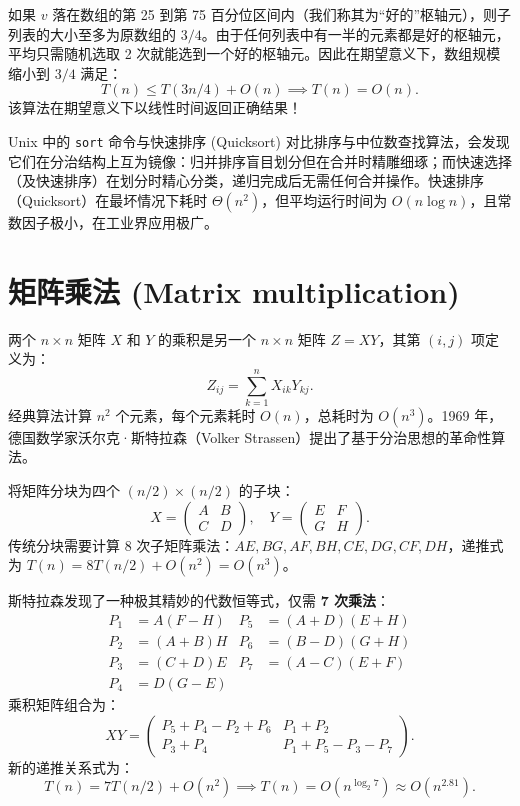 如果 $v$ 落在数组的第 25 到第 75 百分位区间内（我们称其为“好的”枢轴元），则子列表的大小至多为原数组的 $3/4$。由于任何列表中有一半的元素都是好的枢轴元，平均只需随机选取 2 次就能选到一个好的枢轴元。因此在期望意义下，数组规模缩小到 $3/4$ 满足：
\[
T(n) \le T(3n/4) + O(n) \implies T(n) = O(n).
\]
该算法在期望意义下以线性时间返回正确结果！

\begin{sidebarbox}{Unix 中的 \texttt{sort} 命令与快速排序 (Quicksort)}
对比排序与中位数查找算法，会发现它们在分治结构上互为镜像：归并排序盲目划分但在合并时精雕细琢；而快速选择（及快速排序）在划分时精心分类，递归完成后无需任何合并操作。快速排序（Quicksort）在最坏情况下耗时 $\Theta(n^2)$，但平均运行时间为 $O(n \log n)$，且常数因子极小，在工业界应用极广。
\end{sidebarbox}

\section{矩阵乘法 (Matrix multiplication)}

两个 $n \times n$ 矩阵 $X$ 和 $Y$ 的乘积是另一个 $n \times n$ 矩阵 $Z = XY$，其第 $(i, j)$ 项定义为：
\[
Z_{ij} = \sum_{k=1}^n X_{ik} Y_{kj}.
\]
经典算法计算 $n^2$ 个元素，每个元素耗时 $O(n)$，总耗时为 $O(n^3)$。1969 年，德国数学家沃尔克·斯特拉森（Volker Strassen）提出了基于分治思想的革命性算法。

将矩阵分块为四个 $(n/2) \times (n/2)$ 的子块：
\[
X = \begin{pmatrix} A & B \\ C & D \end{pmatrix}, \quad Y = \begin{pmatrix} E & F \\ G & H \end{pmatrix}.
\]
传统分块需要计算 8 次子矩阵乘法：$AE, BG, AF, BH, CE, DG, CF, DH$，递推式为 $T(n) = 8T(n/2) + O(n^2) = O(n^3)$。

斯特拉森发现了一种极其精妙的代数恒等式，仅需 \textbf{7 次乘法}：
\begin{align*}
P_1 &= A(F - H) & P_5 &= (A + D)(E + H) \\
P_2 &= (A + B)H & P_6 &= (B - D)(G + H) \\
P_3 &= (C + D)E & P_7 &= (A - C)(E + F) \\
P_4 &= D(G - E) & &
\end{align*}
乘积矩阵组合为：
\[
XY = \begin{pmatrix} P_5 + P_4 - P_2 + P_6 & P_1 + P_2 \\ P_3 + P_4 & P_1 + P_5 - P_3 - P_7 \end{pmatrix}.
\]
新的递推关系式为：
\[
T(n) = 7T(n/2) + O(n^2) \implies T(n) = O(n^{\log_2 7}) \approx O(n^{2.81}).
\]

